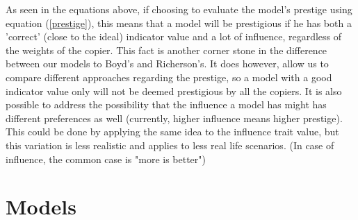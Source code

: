 \documentclass[11pt]{article}
\begin{document}
 
  As seen in the equations above, if choosing to evaluate the model's prestige using equation (\ref{prestige}), this means that a model will be prestigious if he has both a 'correct' (close to the ideal) indicator value and a lot of influence, regardless of the weights of the copier. This fact is another corner stone in the difference between our models to Boyd's and Richerson's.
  It does however, allow us to compare different approaches regarding the prestige, so a model with a good indicator value only will not be deemed prestigious by all the copiers.
  It  is also possible to address the possibility that the influence a model has might has different preferences as well (currently, higher influence means higher prestige). This could be done by applying the same idea to the influence trait value, but this variation is less realistic and applies to less real life scenarios. (In case of influence, the common case is "more is better")
 
\clearpage \section{Models} \label{models}
\end{document}
